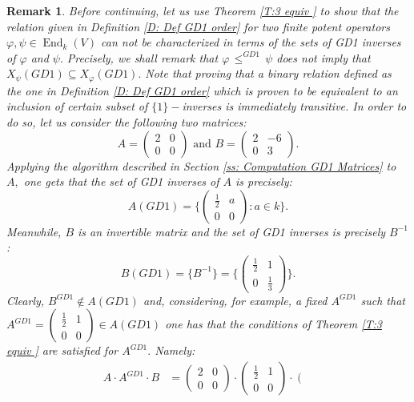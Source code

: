 \documentclass[10pt,a4paper]{amsart}
\theoremstyle{plain}
\newtheorem{rem}[defn]{Remark}
\theoremstyle{remark}
\numberwithin{equation}{section} \numberwithin{defn}{section}
\newcommand\ed{\operatorname{End}}
\newcommand{\f}{\varphi}
\newcommand{\g}{\psi}
\begin{document}
\begin{rem}\label{R: Sin Contencion}
Before continuing, let us use Theorem \ref{T:3 equiv  } to show that the relation given in Definition \ref{D: Def GD1 order} for two finite potent operators $\f, \g \in \ed_k(V)$ can not be characterized in terms of the sets of GD1 inverses of $\f$ and $\g.$ Precisely, we shall remark that $\f \, \leq^{GD1} \, \g$ does not imply that $X_{\g}(GD1)\subseteq X_{\f}(GD1).$ Note that proving that a binary relation defined as the one in Definition \ref{D: Def GD1 order} which is proven to be equivalent to an inclusion of certain subset of $\{1\}-$inverses is immediately transitive. In order to do so, let us consider the following two matrices: $$ A=\left(\begin{matrix}
2 & 0 \\
0 & 0
\end{matrix}\right)
\text{ and }
B=\left(\begin{matrix}
2 & -6 \\
0 & 3
\end{matrix}\right).$$
Applying the algorithm described in Section \ref{ss: Computation GD1 Matrices} to $A,$ one gets that the set of GD1 inverses of $A$ is precisely: $$A(GD1)= \bigg\{\left(\begin{matrix}
\frac{1}{2} & a \\
0 & 0
\end{matrix}\right):a\in k\bigg\}. $$  Meanwhile, $B$ is an invertible matrix and the set of GD1 inverses is precisely $B^{-1}$: $$B(GD1)=\{B^{-1}\}=\bigg\{\left(\begin{matrix}
\frac{1}{2} & 1 \\
0 & \frac{1}{3}
\end{matrix}\right)\bigg\}. $$ Clearly, $B^{GD1}\notin A(GD1)$ and, considering, for example, a fixed $A^{GD1}$ such that $A^{GD1}=\left(\begin{matrix}
\frac{1}{2} & 1 \\
0 & 0
\end{matrix}\right)\in A(GD1)$ one has that the conditions of Theorem \ref{T:3 equiv  } are satisfied for $A^{GD1}.$ Namely: \begin{align*}
A\cdot A^{GD1}\cdot B & = \left(\begin{matrix}
2 & 0 \\
0 & 0
\end{matrix}\right)\cdot \left(\begin{matrix}
\frac{1}{2} & 1 \\
0 & 0
\end{matrix}\right)\cdot \left(\begin{matrix}

\end{matrix}
\end{align*}
\end{rem}
\end{document}
